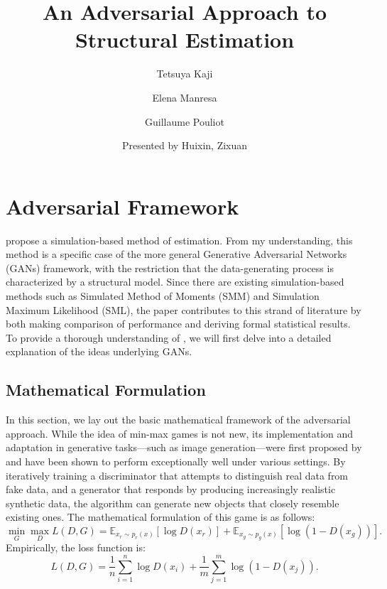 \documentclass[12pt]{article}
\title{\textbf{An Adversarial Approach to Structural Estimation}}
\author{Tetsuya Kaji \and Elena Manresa \and Guillaume Pouliot}
\date{Presented by Huixin, Zixuan}
\begin{document}
\maketitle




\section{Adversarial Framework} \label{sec:framework}

\citet{kaji2023adversarial} propose a simulation-based method of estimation. From my understanding, this method is a specific case of the more general Generative Adversarial Networks (GANs) framework, with the restriction that the data-generating process is characterized by a structural model. Since there are existing simulation-based methods such as Simulated Method of Moments (SMM) and Simulation Maximum Likelihood (SML), the paper contributes to this strand of literature by both making comparison of performance and deriving formal statistical results. To provide a thorough understanding of \citet{kaji2023adversarial}, we will first delve into a detailed explanation of the ideas underlying GANs.

\subsection{Mathematical Formulation} \label{subsec:math_formulation}
In this section, we lay out the basic mathematical framework of the adversarial
approach. While the idea of min-max games is not new, its implementation and
adaptation in generative tasks—such as image generation—were first proposed by
\citet{goodfellow2014generative} and have been shown to perform exceptionally
well under various settings. By iteratively training a discriminator that
attempts to distinguish real data from fake data, and a generator that responds
by producing increasingly realistic synthetic data, the algorithm can generate
new objects that closely resemble existing ones. The mathematical formulation
of this game is as follows:
\begin{equation} \label{eq:gan_objective}
    \min_G \max_D L(D, G)
    = \mathbb{E}_{x_r \sim p_{r}(x)} [\log D(x_r)] + \mathbb{E}_{x_g \sim p_g(x)} [\log(1 - D(x_g))].
\end{equation}
Empirically, the loss function is:
\begin{equation}\label{eq:empirical_loss}
    L(D, G) = \frac{1}{n} \sum_{i=1}^n \log D(x_i) + \frac{1}{m} \sum_{j=1}^m \log (1-D(x_j)).
\end{equation}
\end{document}
